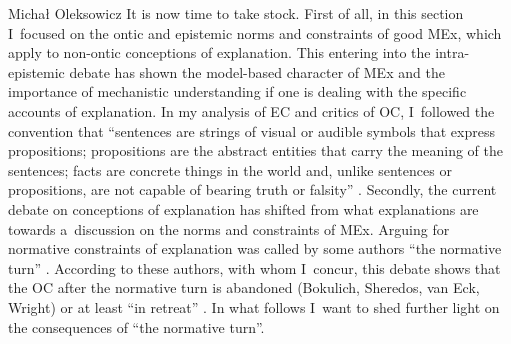 \begin{artengenv}{Michał Oleksowicz}
It is now time to take stock. First of all, in this section I~focused on the ontic and epistemic norms and constraints of good MEx, which apply to non-ontic conceptions of explanation. This entering into the intra-epistemic debate has shown the model-based character of MEx and the importance of mechanistic understanding if one is dealing with the specific accounts of explanation. In my analysis of EC and critics of OC, I~followed the convention that ``sentences are strings of visual or audible symbols that express propositions; propositions are the abstract entities that carry the meaning of the sentences; facts are concrete things in the world and, unlike sentences or propositions, are not capable of bearing truth or falsity''
\parencite[][p.148]{khalifa_understanding_2017}. %
 Secondly, the current debate on conceptions of explanation has shifted from what explanations are towards a~discussion on the norms and constraints of MEx. Arguing for normative constraints of explanation was called by some authors ``the normative turn'' 
\parencites[][p.921]{sheredos_re-reconciling_2016}[][p.1023]{wright_ontic_2018}. %
 According to these authors, with whom I~concur, this debate shows that the OC after the normative turn is abandoned (Bokulich, Sheredos, van Eck, Wright) or at least ``in retreat'' 
\parencite[][]{potochnik_eight_2018}. %
 In what follows I~want to shed further light on the consequences of ``the normative turn''.






\begin{table}[H]
\end{table}
\end{artengenv}
